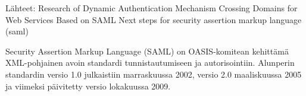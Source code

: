 Lähteet:
Research of Dynamic Authentication Mechanism Crossing Domains for Web Services Based on SAML
Next steps for security assertion markup language (saml)

Security Assertion Markup Language (SAML) on OASIS-komitean kehittämä XML-pohjainen avoin standardi tunnistautumiseen ja autorisointiin. Alunperin standardin versio 1.0 julkaistiin marraskuussa 2002, versio 2.0 maaliskuussa 2005 ja viimeksi päivitetty versio lokakuussa 2009.